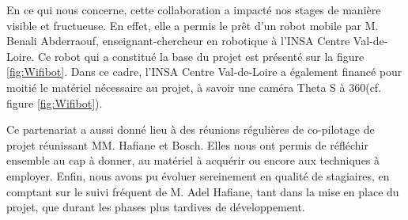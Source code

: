 En ce qui nous concerne, cette collaboration a impacté nos stages de manière visible et fructueuse.
En effet, elle a permis le prêt d'un robot mobile par M. Benali Abderraouf, enseignant-chercheur en robotique à l'INSA Centre Val-de-Loire. 
Ce robot qui a constitué la base du projet est présenté sur la figure \ref{fig:Wifibot}.
Dans ce cadre, l'INSA Centre Val-de-Loire a également financé pour moitié le matériel nécessaire au projet, à savoir une caméra Theta S à 360\degre (cf. figure \ref{fig:Wifibot}).

Ce partenariat a aussi donné lieu à des réunions régulières de co-pilotage de projet réunissant MM. Hafiane et Bosch. 
Elles nous ont permis de réfléchir ensemble au cap à donner, au matériel à acquérir ou encore aux techniques à employer.
Enfin, nous avons pu évoluer sereinement en qualité de stagiaires, en comptant sur le suivi fréquent de M. Adel Hafiane, tant dans la mise en place du projet, que durant les phases plus tardives de développement.
